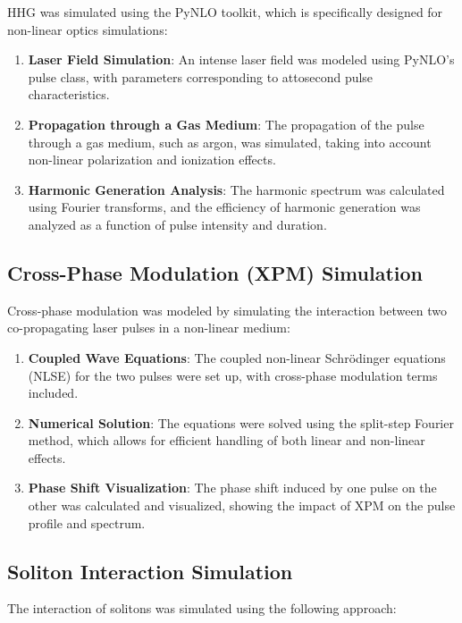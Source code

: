 \documentclass[12pt]{article}
\begin{document}
HHG was simulated using the PyNLO toolkit, which is specifically designed for non-linear optics simulations:

\begin{enumerate}
    \item \textbf{Laser Field Simulation}: An intense laser field was modeled using PyNLO's pulse class, with parameters corresponding to attosecond pulse characteristics.
    \item \textbf{Propagation through a Gas Medium}: The propagation of the pulse through a gas medium, such as argon, was simulated, taking into account non-linear polarization and ionization effects.
    \item \textbf{Harmonic Generation Analysis}: The harmonic spectrum was calculated using Fourier transforms, and the efficiency of harmonic generation was analyzed as a function of pulse intensity and duration.
\end{enumerate}

\subsection{Cross-Phase Modulation (XPM) Simulation}

Cross-phase modulation was modeled by simulating the interaction between two co-propagating laser pulses in a non-linear medium:

\begin{enumerate}
    \item \textbf{Coupled Wave Equations}: The coupled non-linear Schrödinger equations (NLSE) for the two pulses were set up, with cross-phase modulation terms included.
    \item \textbf{Numerical Solution}: The equations were solved using the split-step Fourier method, which allows for efficient handling of both linear and non-linear effects.
    \item \textbf{Phase Shift Visualization}: The phase shift induced by one pulse on the other was calculated and visualized, showing the impact of XPM on the pulse profile and spectrum.
\end{enumerate}

\subsection{Soliton Interaction Simulation}

The interaction of solitons was simulated using the following approach:
\end{document}
